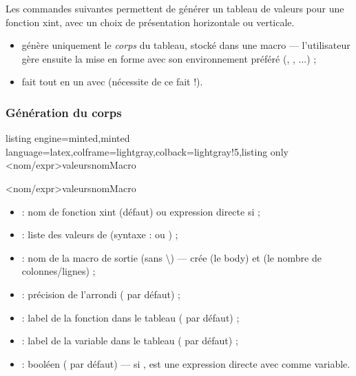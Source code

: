 \documentclass[11pt,a4paper]{ltxdoc}
\begin{document}
Les commandes suivantes permettent de générer un tableau de valeurs
pour une fonction \textsf{xint}, avec un choix de présentation
horizontale ou verticale.

\begin{itemize}
  \item {} génère uniquement
  le \textit{corps} du tableau, stocké dans une macro — l'utilisateur
  gère ensuite la mise en forme avec son environnement préféré
  (, , ...) ;
  \item {} fait tout
  en un avec  (nécessite de ce fait
   !).
\end{itemize}

\subsubsection{Génération du corps}

\begin{tcblisting}{listing engine=minted,minted language=latex,colframe=lightgray,colback=lightgray!5,listing only}
\CalcTableauValeurs[clés]<nom/expr>{valeurs}{nomMacro}

\CalcTableauValeurs*[clés]<nom/expr>{valeurs}{nomMacro}
\end{tcblisting}

\begin{itemize}
  \item {} : nom de fonction \textsf{xint}
  (défaut) ou expression directe si  ;
  \item {} : liste des valeurs de 
  (syntaxe  :
   ou ) ;
  \item {} : nom de la macro de sortie
  (sans \textbackslash) — crée 
  (le body) et 
  (le nombre de colonnes/lignes) ;
  \item {} : précision de l'arrondi
  ( par défaut) ;
  \item {} : label de la fonction dans le tableau
  ( par défaut) ;
  \item {} : label de la variable dans le tableau
  ( par défaut) ;
  \item {} : booléen ( par défaut)
  — si ,  est une expression
  directe avec  comme variable.
\end{itemize}
\end{document}
